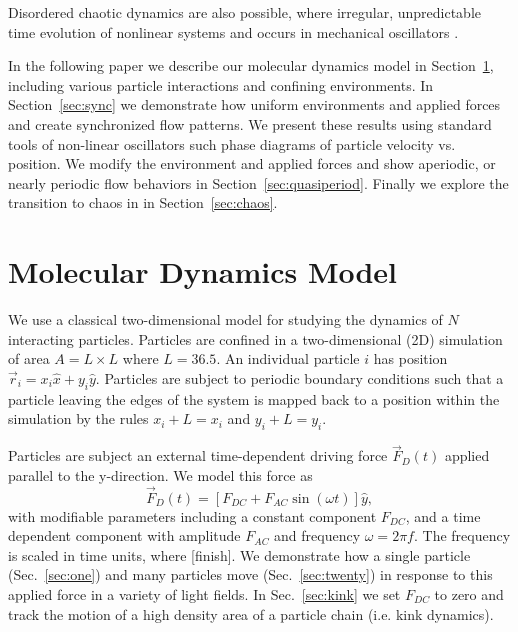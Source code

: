 \documentclass[prb,preprint]{revtex4}
\begin{document}

Disordered chaotic dynamics are also possible,
where irregular, unpredictable time evolution of
nonlinear systems and occurs in mechanical oscillators \cite{chaos}.

In the following paper we describe
our molecular dynamics model in Section~\ref{sec:MD},
including various particle interactions and confining environments.
In Section~\ref{sec:sync} we
demonstrate how uniform environments and applied forces
and create synchronized flow patterns.
We present these results using standard tools of non-linear oscillators
such phase diagrams of particle velocity vs. position.
We modify the environment and applied forces
and show aperiodic, or nearly periodic flow behaviors
in Section~\ref{sec:quasiperiod}.
Finally we explore the transition to chaos in 
in Section~\ref{sec:chaos}.


\section{Molecular Dynamics Model}
\label{sec:MD}
We use a classical two-dimensional model for 
studying the dynamics of $N$ interacting particles. 
Particles are confined in a two-dimensional (2D) 
simulation of area $A = L \times L$ where $L=36.5$.
An individual particle $i$ has
position $\vec{r}_i = x_i \hat{x} + y_i \hat{y}$.
Particles are subject to
periodic boundary conditions
such that a particle leaving the edges of the system is mapped
back to a position within the simulation 
by the rules $x_i+L=x_i$ and $y_i+L=y_i$.

Particles are subject an external time-dependent driving force
$\vec{F}_{D}(t)$
applied parallel to the y-direction.
We model this force as
\begin{equation}
\vec{F}_{D}(t) = [F_{DC} + F_{AC} \sin(\omega t)] \hat{y},
\end{equation}
with modifiable parameters including
a constant component $F_{DC}$,
and a time dependent component with amplitude $F_{AC}$
and frequency $\omega = 2 \pi f$.
The frequency is scaled in time units,
where [finish].
 We demonstrate how a single particle (Sec.~\ref{sec:one})
 and many particles
 move (Sec.~\ref{sec:twenty})
 in response to this applied force in a variety of light fields.
 In Sec.~\ref{sec:kink} we set $F_{DC}$
 to zero and track the motion
 of a high density area of a particle chain
 (i.e. kink dynamics).
\end{document}
